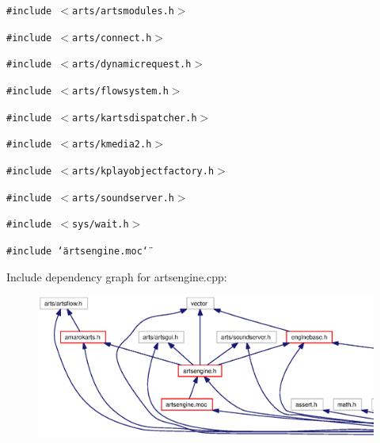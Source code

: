 {\tt \#include $<$arts/artsmodules.h$>$}\par
{\tt \#include $<$arts/connect.h$>$}\par
{\tt \#include $<$arts/dynamicrequest.h$>$}\par
{\tt \#include $<$arts/flowsystem.h$>$}\par
{\tt \#include $<$arts/kartsdispatcher.h$>$}\par
{\tt \#include $<$arts/kmedia2.h$>$}\par
{\tt \#include $<$arts/kplayobjectfactory.h$>$}\par
{\tt \#include $<$arts/soundserver.h$>$}\par
{\tt \#include $<$sys/wait.h$>$}\par
{\tt \#include \char`\"{}artsengine.moc\char`\"{}}\par


Include dependency graph for artsengine.cpp:\begin{figure}[H]
\begin{center}
\leavevmode
\includegraphics[width=420pt]{artsengine_8cpp__incl}
\end{center}
\end{figure}

